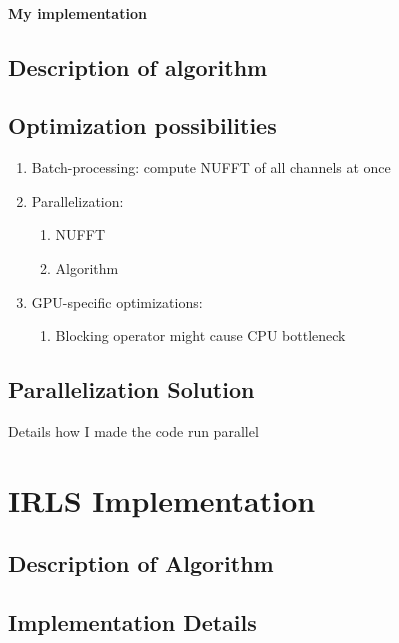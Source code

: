 \paragraph{My implementation}

\subsection{Description of algorithm}

\subsection{Optimization possibilities}
\begin{enumerate}
    \item Batch-processing: compute NUFFT of all channels at once
    \item Parallelization:
    \begin{enumerate}
        \item NUFFT
        \item Algorithm
    \end{enumerate}
    \item GPU-specific optimizations:
    \begin{enumerate}
        \item Blocking operator might cause CPU bottleneck
    \end{enumerate}
\end{enumerate}

\subsection{Parallelization Solution}
Details how I made the code run parallel

\section{IRLS Implementation}

\subsection{Description of Algorithm}
\subsection{Implementation Details}

\clearpage %
